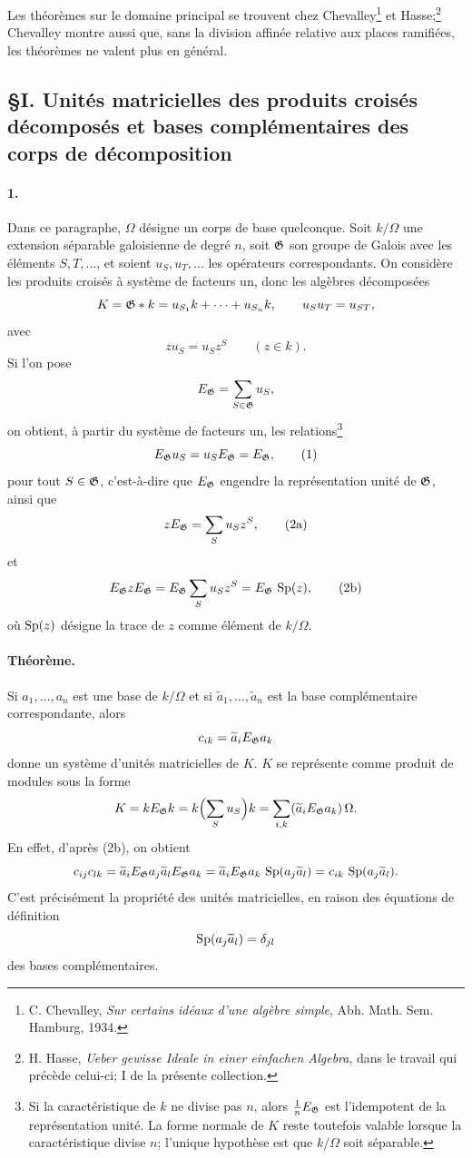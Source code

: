 Les théorèmes sur le domaine principal se trouvent chez Chevalley\footnote{C. Chevalley, \emph{Sur certains idéaux d'une algèbre simple}, Abh. Math. Sem. Hamburg, 1934.} et Hasse;\footnote{H. Hasse, \emph{Ueber gewisse Ideale in einer einfachen Algebra}, dans le travail qui précède celui-ci; I de la présente collection.} Chevalley montre aussi que, sans la division affinée relative aux places ramifiées, les théorèmes ne valent plus en général.

\subsection*{\S{}I. Unités matricielles des produits croisés décomposés et bases complémentaires des corps de décomposition}

\paragraph{1.}
Dans ce paragraphe, \(\Omega\) désigne un corps de base quelconque. Soit \(k/\Omega\) une extension séparable galoisienne de degré \(n\), soit \(\mathfrak G\) son groupe de Galois avec les éléments \(S,T,\ldots\), et soient \(u_S,u_T,\ldots\) les opérateurs correspondants. On considère les produits croisés à système de facteurs un, donc les algèbres décomposées
\[
        K=\mathfrak G\ast k=u_{S_1}k+\cdots+u_{S_n}k,\qquad
        u_Su_T=u_{ST},
\]
avec
\[
        z u_S=u_S z^S \qquad(z\in k).
\]
Si l'on pose
\[
        E_\mathfrak G=\sum_{S\in\mathfrak G}u_S,
\]
on obtient, à partir du système de facteurs un, les relations\footnote{Si la caractéristique de \(k\) ne divise pas \(n\), alors \(\frac1nE_\mathfrak G\) est l'idempotent de la représentation unité. La forme normale de \(K\) reste toutefois valable lorsque la caractéristique divise \(n\); l'unique hypothèse est que \(k/\Omega\) soit séparable.}
\[
        E_\mathfrak G u_S=u_S E_\mathfrak G=E_\mathfrak G,                            \tag{1}
\]
pour tout \(S\in\mathfrak G\), c'est-à-dire que \(E_\mathfrak G\) engendre la représentation unité de \(\mathfrak G\), ainsi que
\[
        zE_\mathfrak G=\sum_Su_Sz^S,                                  \tag{2a}
\]
et
\[
        E_\mathfrak G z E_\mathfrak G
        =E_\mathfrak G\sum_Su_Sz^S
        =E_\mathfrak G\,\operatorname{Sp}(z),                                      \tag{2b}
\]
où \(\operatorname{Sp}(z)\) désigne la trace de \(z\) comme élément de \(k/\Omega\).

\paragraph{Théorème.}
Si \(a_1,\ldots,a_n\) est une base de \(k/\Omega\) et si \(\widetilde a_1,\ldots,\widetilde a_n\) est la base complémentaire correspondante, alors
\[
        c_{ik}=\widetilde a_iE_\mathfrak G a_k
\]
donne un système d'unités matricielles de \(K\). \(K\) se représente comme produit de modules sous la forme
\[
        K=kE_\mathfrak G k
          =k\Bigl(\sum_Su_S\Bigr)k
          =\sum_{i,k}(\widetilde a_iE_\mathfrak G a_k)\,\Omega .
\]
En effet, d'après (2b), on obtient
\[
        c_{ij}c_{lk}
        =\widetilde a_iE_\mathfrak G a_j\widetilde a_lE_\mathfrak G a_k
        =\widetilde a_iE_\mathfrak G a_k\,\operatorname{Sp}(a_j\widetilde a_l)
        =c_{ik}\,\operatorname{Sp}(a_j\widetilde a_l).
\]
C'est précisément la propriété des unités matricielles, en raison des équations de définition
\[
        \operatorname{Sp}(a_j\widetilde a_l)=\delta_{jl}
\]
des bases complémentaires.

